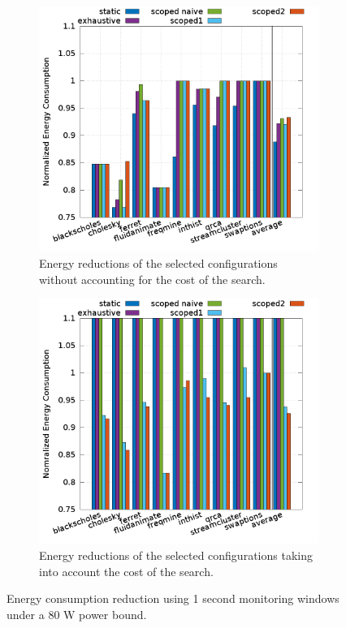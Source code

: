 \begin{figure}[p]
				\centering
        \begin{subfigure}{0.7\columnwidth}
        \includegraphics[width=\columnwidth]{power_aware_runtime/figures/dynamic_conf_energy_consumption_win1000000}
        \caption{Energy reductions of the selected configurations without accounting for the cost of the search.}
	\label{fig:dynamic_analysis_energy_consumption_no_cost}
        \end{subfigure}
	\hfill
        \begin{subfigure}{0.7\columnwidth}
        \includegraphics[width=\columnwidth]{power_aware_runtime/figures/dynamic_conf_energy_consumption_w_cost_win1000000}
        \caption{Energy reductions of the selected configurations taking into account the cost of the search.}
        \label{fig:dynamic_analysis_energy_consumption_w_cost}
        \end{subfigure}
        \caption{Energy consumption reduction using 1 second monitoring windows under a 80 W power bound.}
        \label{fig:dynamic_analysis_energy_consumption}
\end{figure}

